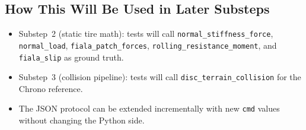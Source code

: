 \subsection{How This Will Be Used in Later Substeps}
\begin{itemize}
  \item Substep~2 (static tire math): tests will call \texttt{normal\_stiffness\_force}, \texttt{normal\_load},
        \texttt{fiala\_patch\_forces}, \texttt{rolling\_resistance\_moment}, and \texttt{fiala\_slip} as ground truth.
  \item Substep~3 (collision pipeline): tests will call \texttt{disc\_terrain\_collision} for the Chrono reference.
  \item The JSON protocol can be extended incrementally with new \texttt{cmd} values without changing the Python side.
\end{itemize}

